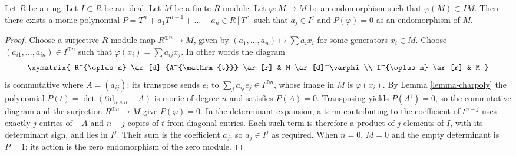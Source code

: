 \begin{lemma}
\label{lemma-charpoly-module-ideal}
Let $R$ be a ring. Let $I \subset R$ be an ideal.
Let $M$ be a finite $R$-module.
Let $\varphi : M \to M$ be an endomorphism such
that $\varphi(M) \subset IM$.
Then there exists a monic polynomial
$P = T^n + a_1 T^{n - 1} + \ldots + a_n \in R[T]$
such that $a_j \in I^j$ and $P(\varphi) = 0$ as an endomorphism of $M$.
\end{lemma}

\begin{proof}
Choose a surjective $R$-module map $R^{\oplus n} \to M$, given by
$(a_1, \ldots, a_n) \mapsto \sum a_ix_i$ for some generators $x_i \in M$.
Choose $(a_{i1}, \ldots, a_{in}) \in I^{\oplus n}$ such that
$\varphi(x_i) = \sum a_{ij} x_j$. In other words the diagram
$$
\xymatrix{
R^{\oplus n} \ar[d]_{A^{\mathrm{t}}} \ar[r] & M \ar[d]^\varphi \\
I^{\oplus n} \ar[r] & M
}
$$
is commutative where $A = (a_{ij})$: its transpose sends
$e_i$ to $\sum_j a_{ij}e_j \in I^{\oplus n}$, whose image in
$M$ is $\varphi(x_i)$. By
Lemma \ref{lemma-charpoly}
the polynomial
$P(t) = \det(t\text{id}_{n \times n} - A)$
is monic of degree $n$ and satisfies $P(A)=0$.
Transposing yields $P(A^{\mathrm{t}})=0$, so the commutative diagram
and the surjection $R^{\oplus n}\to M$ give $P(\varphi)=0$.
In the determinant expansion, a term contributing to the coefficient
of $t^{n-j}$ uses exactly $j$ entries of $-A$ and $n-j$ copies of $t$
from diagonal entries. Each such term is therefore a product of
$j$ elements of $I$, with its determinant sign, and lies in $I^j$.
Their sum is the coefficient $a_j$, so $a_j\in I^j$ as required.
When $n=0$, $M=0$ and the empty determinant is $P=1$;
its action is the zero endomorphism of the zero module.
\end{proof}